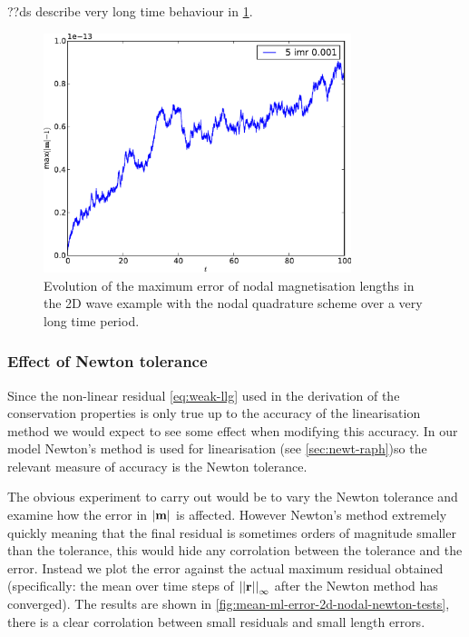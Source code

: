 ??ds describe very long time behaviour in \cref{fig:mean-ml-error-2d-nodal-long-time}.

\begin{figure}
  \centering
  \includegraphics[width=0.8\textwidth]{plots/2d_wave_solution_m_length_long_time/-maxmathbfm-1vst.pdf}
  \caption{Evolution of the maximum error of nodal magnetisation lengths in the 2D wave example with the nodal quadrature scheme over a very long time period.}
  \label{fig:mean-ml-error-2d-nodal-long-time}
\end{figure}



\subsubsection{Effect of Newton tolerance}
\label{sec:effect-newt-toler-m-conservation}

Since the non-linear residual \cref{eq:weak-llg} used in the derivation of the conservation properties is only true up to the accuracy of the linearisation method we would expect to see some effect when modifying this accuracy.
In our model Newton's method is used for linearisation (see \cref{sec:newt-raph})so the relevant measure of accuracy is the Newton tolerance.

The obvious experiment to carry out would be to vary the Newton tolerance and examine how the error in $\left|{\mathbf{m}} \right|$ is affected.
However Newton's method extremely quickly meaning that the final residual is sometimes orders of magnitude smaller than the tolerance, this would hide any corrolation between the tolerance and the error.
Instead we plot the error against the actual maximum residual obtained (specifically: the mean over time steps of $\left| \left| \mathbf{r} \right| \right|_\infty$ after the Newton method has converged). 
The results are shown in \cref{fig:mean-ml-error-2d-nodal-newton-tests}, there is a clear corrolation between small residuals and small length errors.


